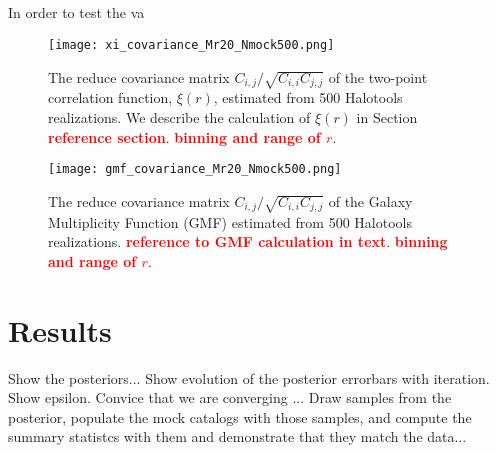 \documentclass[12pt, preprint]{aastex}
\newcommand{\todo}[1]{{\bf \textcolor{red}{ #1}}}
\begin{document}
\subsection{}
In order to test the va
\begin{figure}
\texttt{[image: xi\_covariance\_Mr20\_Nmock500.png]}
\caption{The reduce covariance matrix $C_{i,j}/\sqrt{C_{i,i} C_{j,j}}$ of 
the two-point correlation function, $\xi(r)$, estimated from 500 Halotools 
realizations. We describe the calculation of $\xi(r)$ in Section \todo{reference section}. \todo{binning and range of $r$}.}
\label{fig:2pcf_cov}
\end{figure}
\begin{figure}
  \texttt{[image: gmf\_covariance\_Mr20\_Nmock500.png]}
\caption{The reduce covariance matrix $C_{i,j}/\sqrt{C_{i,i} C_{j,j}}$ of 
the Galaxy Multiplicity Function (GMF) estimated from 500 Halotools 
realizations. \todo{reference to GMF calculation in text}. 
\todo{binning and range of $r$}.}
\label{fig:gmf_cov}
\end{figure}

\section{Results}\label{sec:results}
Show the posteriors...
Show evolution of the posterior errorbars with iteration. Show epsilon. Convice that we are converging ...
Draw samples from the posterior, populate the mock catalogs with those samples, and compute the summary statistcs with them 
and demonstrate that they match the data...
\end{document}
